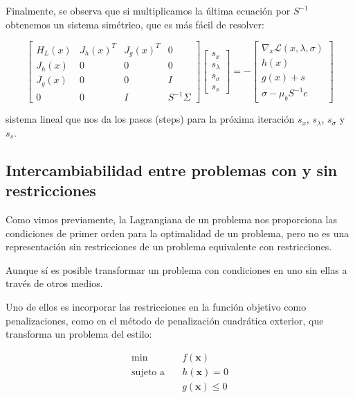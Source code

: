 Finalmente, se observa que si multiplicamos la última ecuación por $S^{-1}$
obtenemos un sistema simétrico, que es más fácil de resolver:

\begin{equation}
	\begin{bmatrix}
		H_L(x) & J_h(x)^T & J_g(x)^T & 0            \\
		J_h(x) & 0        & 0        & 0            \\
		J_g(x) & 0        & 0        & I            \\
		0      & 0        & I        & S^{-1}\Sigma
	\end{bmatrix}
	\begin{bmatrix}
		s_x       \\
		s_\lambda \\
		s_\sigma  \\
		s_s
	\end{bmatrix}
	= -
	\begin{bmatrix}
		\nabla_x \mathcal{L}(x, \lambda, \sigma) \\
		h(x)                                     \\
		g(x) + s                                 \\
		\sigma - \mu_b S^{-1}e
	\end{bmatrix}
\end{equation}

sistema lineal que nos da los pasos (steps) para la próxima iteración $s_x$,
$s_\lambda$, $s_\sigma$ y  $s_s$.

\subsection{Intercambiabilidad entre problemas con y sin restricciones}

Como vimos previamente, la Lagrangiana de un problema nos proporciona las
condiciones de primer orden para la optimalidad de un problema, pero no es una
representación sin restricciones de un problema equivalente con restricciones.

Aunque sí es posible transformar un problema con condiciones en uno sin ellas a
través de otros medios.

Uno de ellos es incorporar las restricciones en la función objetivo como
penalizaciones, como en el método de penalización cuadrática exterior, que
transforma un problema del estilo:

\begin{align}
	\min \quad            & f(\mathbf{x})         \\
	\text{sujeto a} \quad & h(\mathbf{x}) = 0     \\
	                      & g(\mathbf{x}) \leq  0
\end{align}

